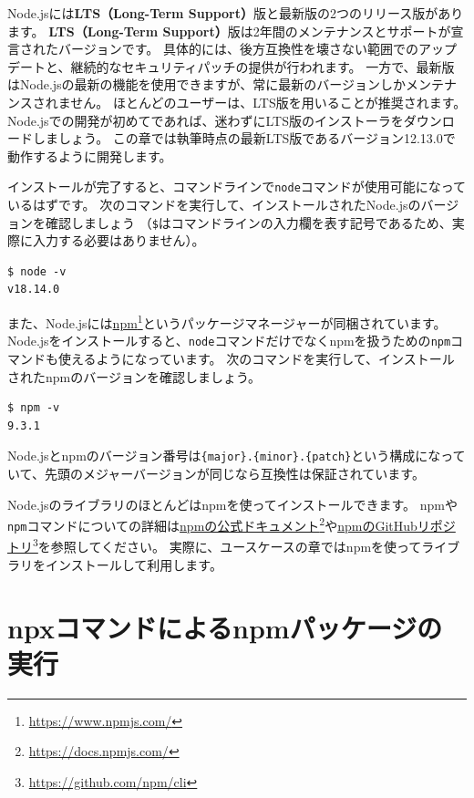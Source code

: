 Node.jsには\textbf{LTS（Long-Term
Support）}版と最新版の2つのリリース版があります。 \textbf{LTS（Long-Term
Support）}版は2年間のメンテナンスとサポートが宣言されたバージョンです。
具体的には、後方互換性を壊さない範囲でのアップデートと、継続的なセキュリティパッチの提供が行われます。
一方で、最新版はNode.jsの最新の機能を使用できますが、常に最新のバージョンしかメンテナンスされません。
ほとんどのユーザーは、LTS版を用いることが推奨されます。Node.jsでの開発が初めてであれば、迷わずにLTS版のインストーラをダウンロードしましょう。
この章では執筆時点の最新LTS版であるバージョン12.13.0で動作するように開発します。

インストールが完了すると、コマンドラインで\texttt{node}コマンドが使用可能になっているはずです。
次のコマンドを実行して、インストールされたNode.jsのバージョンを確認しましょう
（\texttt{\$}はコマンドラインの入力欄を表す記号であるため、実際に入力する必要はありません）。

\begin{lstlisting}
$ node -v
v18.14.0
\end{lstlisting}

また、Node.jsには\href{https://www.npmjs.com/}{npm}\footnote{\url{https://www.npmjs.com/}}というパッケージマネージャーが同梱されています。
Node.jsをインストールすると、\texttt{node}コマンドだけでなくnpmを扱うための\texttt{npm}コマンドも使えるようになっています。
次のコマンドを実行して、インストールされたnpmのバージョンを確認しましょう。

\begin{lstlisting}
$ npm -v
9.3.1
\end{lstlisting}

Node.jsとnpmのバージョン番号は\texttt{\{major\}.\{minor\}.\{patch\}}という構成になっていて、先頭のメジャーバージョンが同じなら互換性は保証されています。

Node.jsのライブラリのほとんどはnpmを使ってインストールできます。
npmや\texttt{npm}コマンドについての詳細は\href{https://docs.npmjs.com/}{npmの公式ドキュメント}\footnote{\url{https://docs.npmjs.com/}}や\href{https://github.com/npm/cli}{npmのGitHubリポジトリ}\footnote{\url{https://github.com/npm/cli}}を参照してください。
実際に、ユースケースの章ではnpmを使ってライブラリをインストールして利用します。

\hypertarget{npx-execution}{%
\section{npxコマンドによるnpmパッケージの実行}\label{npx-execution}}

